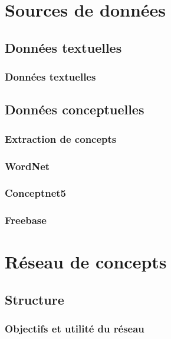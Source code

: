 \documentclass[12pt]{beamer}
\begin{document}

\section{Sources de données}

\subsection{Données textuelles}

\begin{frame}
 \frametitle{Données textuelles}
 
 
\end{frame}

\subsection{Données conceptuelles}

\begin{frame}
 \frametitle{Extraction de concepts}
 
 
\end{frame}

\begin{frame}
 \frametitle{WordNet}
 
 
\end{frame}

\begin{frame}
 \frametitle{Conceptnet5}
 
 
\end{frame}

\begin{frame}
 \frametitle{Freebase}
 
 
\end{frame}



\section{Réseau de concepts}

\subsection{Structure}

\begin{frame}
 \frametitle{Objectifs et utilité du réseau}
 
 
\end{frame}
\end{document}
